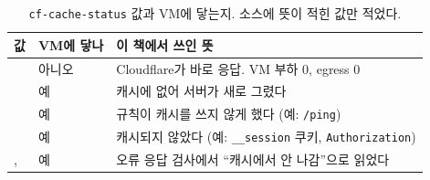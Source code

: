 \begin{table}[H]
  \caption{\texttt{cf-cache-status} 값과 VM에 닿는지. 소스에 뜻이 적힌 값만 적었다.}
  \label{tab:cfs-values}
  \centering\small
  \begin{tabularx}{\linewidth}{@{}L{2.8cm}L{2.6cm}Y@{}}
    \toprule
    값 & VM에 닿나 & 이 책에서 쓰인 뜻 \\
    \midrule
     & 아니오 & Cloudflare가 바로 응답. VM 부하 0, egress 0 \\
    \midrule
     & 예 & 캐시에 없어 서버가 새로 그렸다 \\
    \midrule
     & 예 & 규칙이 캐시를 쓰지 않게 했다 (예: \texttt{/ping}) \\
    \midrule
     & 예 & 캐시되지 않았다 (예: \texttt{\_\_session} 쿠키, \texttt{Authorization}) \\
    \midrule
    ,  & 예 & 오류 응답 검사에서 ``캐시에서 안 나감''으로 읽었다 \\
    \bottomrule
  \end{tabularx}
\end{table}
